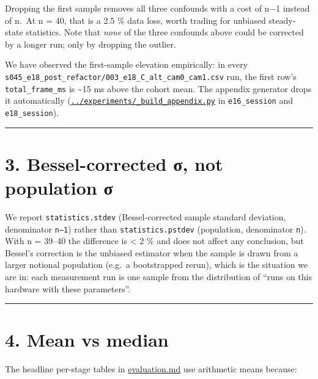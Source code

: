 Dropping the first sample removes all three confounds with a cost of n−1
instead of n.~At n = 40, that is a 2.5 \% data loss, worth trading for
unbiased steady-state statistics. Note that \emph{none} of the three
confounds above could be corrected by a longer run; only by dropping the
outlier.

We have observed the first-sample elevation empirically: in every
\texttt{s045\_e18\_post\_refactor/003\_e18\_C\_alt\_cam0\_cam1.csv} run,
the first row's \texttt{total\_frame\_ms} is \textasciitilde15 ms above
the cohort mean. The appendix generator drops it automatically
(\href{../experiments/_build_appendix.py}{\texttt{../experiments/\_build\_appendix.py}}
in \texttt{e16\_session} and \texttt{e18\_session}).

\begin{center}\rule{0.5\linewidth}{0.5pt}\end{center}

\section{3. Bessel-corrected σ, not population
σ}\label{bessel-corrected-ux3c3-not-population-ux3c3}

We report \texttt{statistics.stdev} (Bessel-corrected sample standard
deviation, denominator \texttt{n−1}) rather than
\texttt{statistics.pstdev} (population, denominator \texttt{n}). With n
= 39--40 the difference is \textless{} 2 \% and does not affect any
conclusion, but Bessel's correction is the unbiased estimator when the
sample is drawn from a larger notional population (e.g.~a bootstrapped
rerun), which is the situation we are in: each measurement run is one
sample from the distribution of ``runs on this hardware with these
parameters''.

\begin{center}\rule{0.5\linewidth}{0.5pt}\end{center}

\section{4. Mean vs median}\label{mean-vs-median}

The headline per-stage tables in \url{evaluation.md} use arithmetic
means because:

